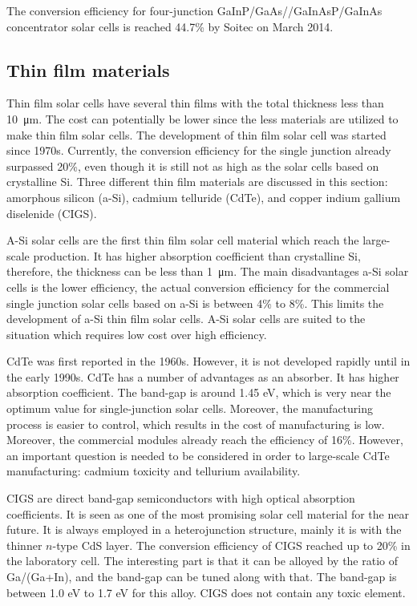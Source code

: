 \documentclass[a4paper, 12pt, titlepage,oneside,drop]{kthesis}
\begin{document}
The conversion efficiency for four-junction GaInP/GaAs//GaInAsP/GaInAs concentrator solar cells is reached 44.7\% by Soitec on March 2014.

\subsection{Thin film materials}

Thin film solar cells have several thin films with the total thickness less than \SI{10} {\micro\meter}. The cost can potentially be lower since the less materials are utilized to make thin film solar cells. The development of thin film
solar cell was started since 1970s. Currently, the conversion efficiency for the single junction already surpassed 20\%, even though it is still not as high as the solar cells based on crystalline Si. Three different thin film
materials are discussed in this section: amorphous silicon (a-Si), cadmium telluride (CdTe), and copper indium gallium diselenide (CIGS).

A-Si solar cells are the first thin film solar cell material which reach the large-scale production. It has higher absorption coefficient than crystalline Si, therefore, the thickness can be less than \SI{1} {\micro\meter}. The 
main disadvantages a-Si solar cells is the lower efficiency, the actual conversion efficiency for the commercial single junction solar cells based on a-Si is between 4\% to 8\%. This limits the development of a-Si thin film solar cells.
A-Si solar cells are suited to the situation which requires low cost over high efficiency. 

CdTe was first reported in the 1960s. However, it is not developed rapidly until in the early 1990s. CdTe has a number of advantages as an absorber. It has higher absorption coefficient. The band-gap is around 1.45 eV, which 
is very near the optimum value for single-junction solar cells. Moreover, the manufacturing process is easier to control, which results in the cost of manufacturing is low. Moreover, the commercial modules already reach the efficiency of 16\%.
However, an important question is needed to be considered in order to large-scale CdTe manufacturing: cadmium toxicity and tellurium availability. 

CIGS are direct band-gap semiconductors with high optical absorption coefficients. It is seen as one of the most promising solar cell material for the near future. It is always employed in a heterojunction structure, mainly it is with the thinner
$n$-type CdS layer. The conversion efficiency of CIGS reached up to 20\% in the laboratory cell. The interesting part is that it can be alloyed by the ratio of Ga/(Ga+In), and the band-gap can be tuned along with that. The band-gap 
is between 1.0 eV to 1.7 eV for this alloy. CIGS does not contain any toxic element.
\end{document}
